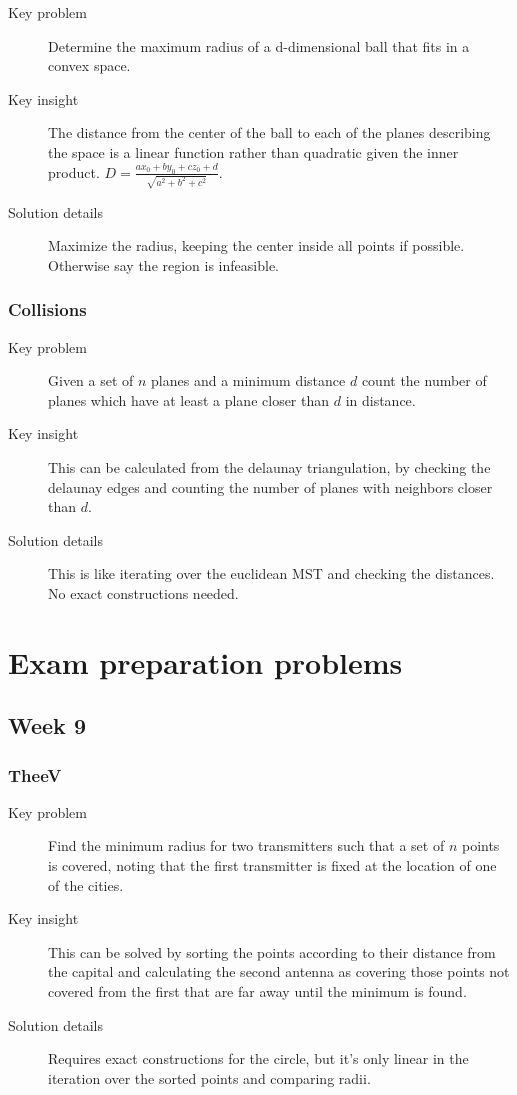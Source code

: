 \documentclass[11pt]{book}
\begin{document}
\begin{description}
	\item[Key problem] Determine the maximum radius of a d-dimensional ball that fits in a convex space.
	\item[Key insight] The distance from the center of the ball to each of the planes describing the space is a linear function rather than quadratic given the inner product. $D = \frac{ax_0 + by_0 + cz_0 + d}{\sqrt{a^2 + b^2 + c^2}}$.
	\item[Solution details] Maximize the radius, keeping the center inside all points if possible. Otherwise say the region is infeasible.
\end{description}

\subsection{Collisions}

\begin{description}
	\item[Key problem] Given a set of $n$ planes and a minimum distance $d$ count the number of planes which have at least a plane closer than $d$ in distance.
	\item[Key insight] This can be calculated from the delaunay triangulation, by checking the delaunay edges and counting the number of planes with neighbors closer than $d$.
	\item[Solution details] This is like iterating over the euclidean MST and checking the distances. No exact constructions needed.
\end{description}

\chapter{Exam preparation problems}

\section{Week 9}

\subsection{TheeV}

\begin{description}
	\item[Key problem] Find the minimum radius for two transmitters such that a set of $n$ points is covered, noting that the first transmitter is fixed at the location of one of the cities.
	\item[Key insight] This can be solved by sorting the points according to their distance from the capital and calculating the second antenna as covering those points not covered from the first that are far away until the minimum is found.
	\item[Solution details] Requires exact constructions for the circle, but it's only linear in the iteration over the sorted points and comparing radii.
\end{description}
\end{document}

